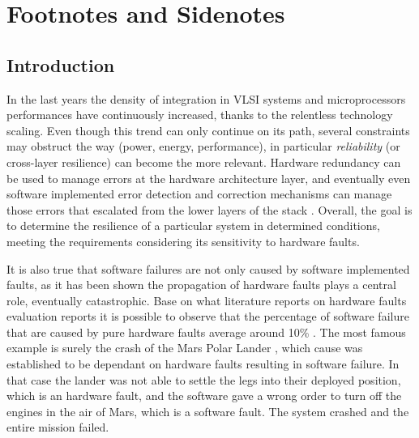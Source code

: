 \documentclass[./dissertation.tex]{subfiles}
\begin{document}
    \chapter{Footnotes and Sidenotes}
\section{Introduction}
\label{introduction}
In the last years the density of integration in VLSI systems and microprocessors performances have continuously increased, thanks to the relentless technology scaling. Even though this trend can only continue on its path, several constraints may obstruct the way (power, energy, performance), in particular \textit{reliability} (or cross-layer resilience) can become the more relevant. Hardware redundancy can be used to manage errors at the hardware architecture layer, and eventually even software implemented error detection and correction mechanisms can manage those errors that escalated from the lower layers of the stack \cite{7544311} \cite{6560692}. Overall, the goal is to determine the resilience of a particular system in determined conditions, meeting the requirements considering its sensitivity to hardware faults.

It is also true that software failures are not only caused by software implemented faults, as it has been shown \cite{6258310} the propagation of hardware faults plays a central role, eventually catastrophic. Base on what literature reports on hardware faults evaluation reports \cite{EBRAHIMI20141000} \cite{7604674} it is possible to observe that the percentage of software failure that are caused by pure hardware faults average around 10\% \cite{kooli:lirmm-01693156}. The most famous example is surely the crash of the Mars Polar Lander \cite{1181509}, which cause was established to be dependant on hardware faults resulting in software failure. In that case the lander was not able to settle the legs into their deployed position, which is an hardware fault, and the software gave a wrong order to turn off the engines in the air of Mars, which is a software fault. The system crashed and the entire mission failed.
\end{document}
